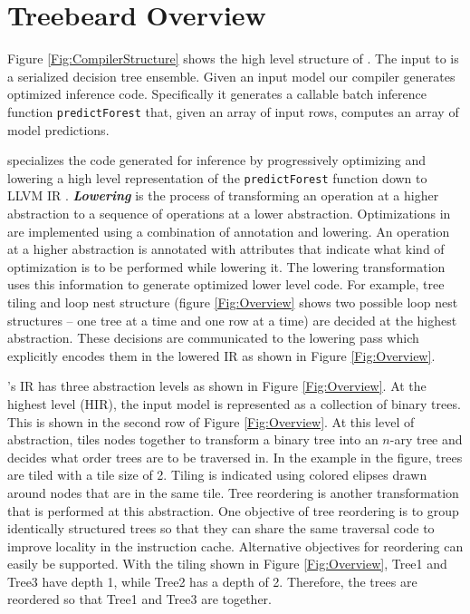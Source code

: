 \section{Treebeard Overview}
Figure \ref{Fig:CompilerStructure} shows the high level structure of \Treebeard{}. 
The input to \Treebeard{} is a serialized decision tree ensemble. 
Given an input model our compiler generates optimized inference code. Specifically it generates a 
callable batch inference function \texttt{predictForest} that, given an array of input rows, computes an
array of model predictions. 
 
\Treebeard{} specializes the code generated for inference by progressively optimizing and lowering a 
high level representation of the \texttt{predictForest} function down to LLVM IR \cite{LLVM}.
\textbf{\emph{Lowering}} is the process of transforming an operation at a higher 
abstraction to a sequence of operations at a lower abstraction. Optimizations in \Treebeard{} 
are implemented using a combination of annotation and lowering. An operation at a higher 
abstraction is annotated with attributes that indicate what kind of optimization is 
to be performed while lowering it. The lowering transformation uses this information to generate 
optimized lower level code. For example, tree tiling and loop nest structure (figure \ref{Fig:Overview} 
shows two possible loop nest structures -- one tree at a time and one row at a time) are decided 
at the highest abstraction. These decisions are communicated to the lowering pass 
which explicitly encodes them in the lowered IR as shown in Figure \ref{Fig:Overview}.

\Treebeard{}'s IR has three abstraction levels as shown in Figure \ref{Fig:Overview}.  
At the highest level (HIR), the input model is represented as a collection of binary trees. This is shown 
in the second row of Figure \ref{Fig:Overview}. At this level of abstraction,
\Treebeard{} tiles nodes together to transform a binary tree into an $n$-ary tree 
and decides what order trees are to be traversed in. In the example in the figure, 
trees are tiled with a tile size of 2. Tiling is indicated using colored elipses drawn 
around nodes that are in the same tile. Tree reordering is another transformation that is performed at this abstraction. 
One objective of tree reordering is to group identically structured trees so that they can share the same traversal code
to improve locality in the instruction cache.  Alternative objectives for reordering can easily be supported.
With the tiling shown in Figure \ref{Fig:Overview}, Tree1 and Tree3 have depth 1, while Tree2 has a depth of 2.
Therefore, the trees are reordered so that Tree1 and Tree3 are together. 

